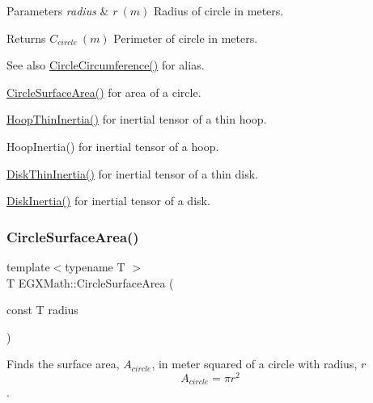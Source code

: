 \begin{DoxyParams}{Parameters}
{\em radius} & $ r\ (m)$ Radius of circle in meters. \\
\hline
\end{DoxyParams}
\begin{DoxyReturn}{Returns}
$ C_{circle}\ (m)$ Perimeter of circle in meters. 
\end{DoxyReturn}
\begin{DoxySeeAlso}{See also}
\mbox{\hyperlink{group___e_g_x_math-_geometry-2_d-_circle_gadb55695b75a06a3f3534494eb767e18e}{Circle\+Circumference()}} for alias. 

\mbox{\hyperlink{group___e_g_x_math-_geometry-2_d-_circle_gaa4486100a643c57bd7a80c1c11ae3f60}{Circle\+Surface\+Area()}} for area of a circle. 

\mbox{\hyperlink{group___e_g_x_math-_geometry-3_d-_hoop_gab3a84dc2aa29ce0db990425747d291c6}{Hoop\+Thin\+Inertia()}} for inertial tensor of a thin hoop. 

Hoop\+Inertia() for inertial tensor of a hoop. 

\mbox{\hyperlink{group___e_g_x_math-_geometry-3_d-_disk_ga8dcadf6cd5680294a84311c6767e3caf}{Disk\+Thin\+Inertia()}} for inertial tensor of a thin disk. 

\mbox{\hyperlink{group___e_g_x_math-_geometry-3_d-_disk_ga6ed461694b277e36a641a6550bdea68f}{Disk\+Inertia()}} for inertial tensor of a disk. 
\end{DoxySeeAlso}
\mbox{\label{group___e_g_x_math-_geometry-2_d-_circle_gaa4486100a643c57bd7a80c1c11ae3f60}} 
\subsubsection{\texorpdfstring{Circle\+Surface\+Area()}{CircleSurfaceArea()}}
{\footnotesize\ttfamily template$<$typename T $>$ \\
T E\+G\+X\+Math\+::\+Circle\+Surface\+Area (\begin{DoxyParamCaption}\item[{const T}]{radius }\end{DoxyParamCaption})}



Finds the surface area, $A_{circle}$, in meter squared of a circle with radius, $r$ \[ A_{circle}=\pi r^2 \]. 

